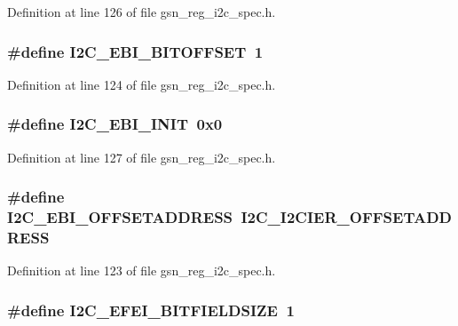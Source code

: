 Definition at line 126 of file gsn\_\-reg\_\-i2c\_\-spec.h.

\hypertarget{a00558_a7af79be0ee7d90fe784546a459cac734}{
\subsubsection[{I2C\_\-EBI\_\-BITOFFSET}]{\setlength{\rightskip}{0pt plus 5cm}\#define I2C\_\-EBI\_\-BITOFFSET~1}}
\label{a00558_a7af79be0ee7d90fe784546a459cac734}


Definition at line 124 of file gsn\_\-reg\_\-i2c\_\-spec.h.

\hypertarget{a00558_a0f86739c5e48834a500e521008ed64ed}{
\subsubsection[{I2C\_\-EBI\_\-INIT}]{\setlength{\rightskip}{0pt plus 5cm}\#define I2C\_\-EBI\_\-INIT~0x0}}
\label{a00558_a0f86739c5e48834a500e521008ed64ed}


Definition at line 127 of file gsn\_\-reg\_\-i2c\_\-spec.h.

\hypertarget{a00558_a09ab6175f520e3faa44612a7b44c8d03}{
\subsubsection[{I2C\_\-EBI\_\-OFFSETADDRESS}]{\setlength{\rightskip}{0pt plus 5cm}\#define I2C\_\-EBI\_\-OFFSETADDRESS~I2C\_\-I2CIER\_\-OFFSETADDRESS}}
\label{a00558_a09ab6175f520e3faa44612a7b44c8d03}


Definition at line 123 of file gsn\_\-reg\_\-i2c\_\-spec.h.

\hypertarget{a00558_a52046e9efd7265a136b9980a370cf649}{
\subsubsection[{I2C\_\-EFEI\_\-BITFIELDSIZE}]{\setlength{\rightskip}{0pt plus 5cm}\#define I2C\_\-EFEI\_\-BITFIELDSIZE~1}}
\label{a00558_a52046e9efd7265a136b9980a370cf649}


